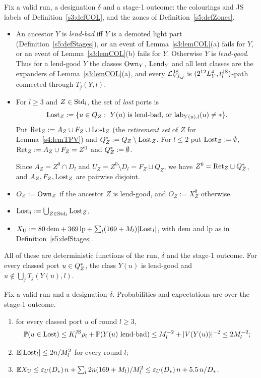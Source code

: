 \begin{definition}\label{s6:defLending}
Fix a valid run, a designation $\delta$ and a stage-1 outcome: the colourings and JS labels of Definition~\ref{s3:defCOL}, and the zones of Definition~\ref{s5:defZones}.
\begin{itemize}
\item An ancestor $Y$ is \emph{lend-bad} iff $Y$ is a demoted light part (Definition~\ref{s5:defStages}), or an event of Lemma~\ref{s3:lemCOL}(a) fails for $Y$, or an event of Lemma~\ref{s3:lemCOL}(b) fails for $Y$. Otherwise $Y$ is \emph{lend-good}. Thus for a lend-good $Y$ the classes $\mathrm{Own}_Y$, $\mathrm{Lend}_Y$ and all lent classes are the expanders of Lemma~\ref{s3:lemCOL}(a), and every $\mathcal{L}^{\mathrm{JS}}_{Y,l,j}$ is $(2^{12}L_Y^4,t^{\mathrm{JS}}_l)$-path connected through $T_j(Y,l)$.
\item For $l\ge3$ and $Z\in\mathrm{Std}_l$, the set of \emph{lost} ports is
\[
\mathrm{Lost}_Z:=\{u\in Q_Z:\ Y(u)\text{ is lend-bad, or }\mathrm{lab}_{Y(u),l}(u)\neq*\}.
\]
Put $\mathrm{Ret}_Z:=A_Z\cup F_Z\cup\mathrm{Lost}_Z$ (the \emph{retirement set} of $Z$ for Lemma~\ref{s4:lemTPV}) and $Q^{*}_Z:=Q_Z\setminus\mathrm{Lost}_Z$. For $l\le2$ put $\mathrm{Lost}_Z:=\emptyset$, $\mathrm{Ret}_Z:=A_Z\cup F_Z=Z^0$ and $Q^{*}_Z:=\emptyset$.

Since $A_Z=Z^0\cap D_l$ and $U_Z=Z^0\setminus D_l=F_Z\sqcup Q_Z$, we have $Z^0=\mathrm{Ret}_Z\sqcup Q^{*}_Z$, and $A_Z,F_Z,\mathrm{Lost}_Z$ are pairwise disjoint.
\item $O_Z:=\mathrm{Own}_Z$ if the ancestor $Z$ is lend-good, and $O_Z:=X^0_Z$ otherwise.
\item $\mathrm{Lost}_l:=\bigcup_{Z\in\mathrm{Std}_l}\mathrm{Lost}_Z$.
\item $X_{\mathrm{U}}:=80\,\mathrm{dem}+369\,\mathrm{lp}+\sum_l(169+M_l)|\mathrm{Lost}_l|$, with $\mathrm{dem}$ and $\mathrm{lp}$ as in Definition~\ref{s5:defStages}.
\end{itemize}
All of these are deterministic functions of the run, $\delta$ and the stage-1 outcome. For every classed port $u\in Q^{*}_Z$, the class $Y(u)$ is lend-good and $u\notin\bigcup_jT_j(Y(u),l)$.
\deps{\ref{s3:defCOL}, \ref{s3:lemCOL}, \ref{s5:defStages}, \ref{s6:defDesign}, \ref{s5:defZones}}
\end{definition}

\begin{lemma}\label{s6:lemLost}
Fix a valid run and a designation $\delta$. Probabilities and expectations are over the stage-1 outcome.
\begin{enumerate}
\item[(i)] for every classed port $u$ of round $l\ge3$,
\[
\mathbb{P}(u\in\mathrm{Lost})\le K^{\mathrm{JS}}_l\rho_l+\mathbb{P}(Y(u)\text{ lend-bad})\le M_l^{-2}+|V(Y(u))|^{-2}\le2M_l^{-2};
\]
\item[\textup{(K6)}] $\mathbb{E}|\mathrm{Lost}_l|\le2n/M_l^2$ for every round $l$;
\item[(iii)] $\mathbb{E}X_{\mathrm{U}}\le\varepsilon_{U}(D_{*})\,n+\sum_l2n(169+M_l)/M_l^2\le\varepsilon_{U}(D_{*})\,n+5.5\,n/D_{*}$.
\end{enumerate}
\deps{\ref{s6:defLending}, \ref{s3:lemCOL}, \ref{s5:lemE1}, \ref{s5:lemExpect}, \ref{s2:propStructure}, \ref{s2:lemTower}, \ref{s3:defCOL}}
\end{lemma}

